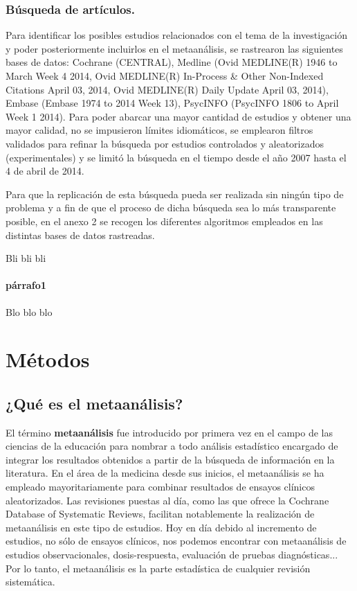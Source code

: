 \documentclass[a4paper,openright,12pt]{report}
\begin{document}
\subsubsection{Búsqueda de artículos.}

Para identificar los posibles estudios relacionados con el tema de la investigación y poder posteriormente incluirlos en el metaanálisis, se rastrearon las siguientes bases de datos: Cochrane (CENTRAL), Medline (Ovid MEDLINE(R) 1946 to March Week 4 2014, Ovid MEDLINE(R) In-Process & Other Non-Indexed Citations April 03, 2014,  Ovid MEDLINE(R) Daily Update April 03, 2014), Embase (Embase 1974 to 2014 Week 13), PsycINFO (PsycINFO 1806 to April Week 1 2014). Para poder abarcar una mayor cantidad de estudios y obtener una mayor calidad, no se impusieron límites idiomáticos, se emplearon filtros validados para refinar la búsqueda por estudios controlados y aleatorizados (experimentales) y se limitó la búsqueda en el tiempo desde el año 2007 hasta el 4 de abril de 2014.

Para que la replicación de esta búsqueda pueda ser realizada sin ningún tipo de problema y a fin de que el proceso de dicha búsqueda sea lo más transparente posible, en el anexo 2 se recogen los diferentes algoritmos empleados en las distintas bases de datos rastreadas.

Bli bli bli
\paragraph{párrafo1}
Blo blo blo
\newpage
\section{Métodos}
\subsection{¿Qué es el metaanálisis?}

El término \textbf{metaanálisis} fue introducido por primera vez en el campo de las ciencias de la educación \cite{Glass1976} para nombrar a todo análisis estadístico encargado de integrar los resultados obtenidos a partir de la búsqueda de información en la literatura. En el área de la medicina desde sus inicios, el metaanálisis se ha empleado mayoritariamente para combinar resultados de ensayos clínicos aleatorizados. Las revisiones puestas al día, como las que ofrece la Cochrane Database of Systematic Reviews, facilitan notablemente la realización de metaanálisis en este tipo de estudios. Hoy en día debido al incremento de estudios, no sólo de ensayos clínicos, nos podemos encontrar con metaanálisis de estudios observacionales, dosis-respuesta, evaluación de pruebas diagnósticas...  Por lo tanto, el metaanálisis es la parte estadística de cualquier revisión sistemática.
\end{document}
